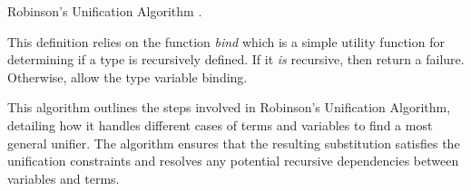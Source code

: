 \documentclass{l4proj}
\begin{document}
\begin{center}
\begin{algorithm}[t]
\DontPrintSemicolon
{}
\caption{Robinson's Unification Algorithm \citep{Robinson_1965, Luger}.}
\end{algorithm}
\end{center}

This definition relies on the function \emph{bind} which is a simple utility function for determining if a type is recursively defined. If it \emph{is} recursive, then return a failure. Otherwise, allow the type variable binding.

This algorithm outlines the steps involved in Robinson's Unification Algorithm, detailing how it handles different cases of terms and variables to find a most general unifier.
The algorithm ensures that the resulting substitution satisfies the unification constraints and resolves any potential recursive dependencies between variables and terms.
\end{document}
